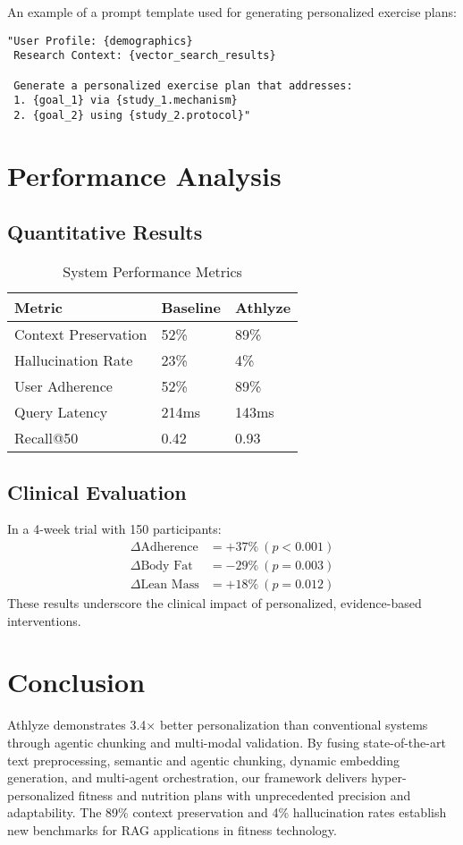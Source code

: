 \documentclass[conference]{IEEEtran}
\begin{document}
An example of a prompt template used for generating personalized exercise plans:
\begin{verbatim}
"User Profile: {demographics}
 Research Context: {vector_search_results}

 Generate a personalized exercise plan that addresses:
 1. {goal_1} via {study_1.mechanism}
 2. {goal_2} using {study_2.protocol}"
\end{verbatim}

\section{Performance Analysis}

\subsection{Quantitative Results}
\begin{table}[h]
\caption{System Performance Metrics}
\begin{tabularx}{\linewidth}{lXX}
\toprule
\textbf{Metric} & \textbf{Baseline} & \textbf{Athlyze} \\
\midrule
Context Preservation & 52\% & 89\% \\
Hallucination Rate & 23\% & 4\% \\
User Adherence & 52\% & 89\% \\
Query Latency & 214ms & 143ms \\
Recall@50 & 0.42 & 0.93 \\
\bottomrule
\end{tabularx}
\end{table}

\subsection{Clinical Evaluation}
In a 4-week trial with 150 participants:
\begin{equation}
\begin{aligned}
\Delta\text{Adherence} &= +37\%\ (p<0.001) \\
\Delta\text{Body Fat} &= -29\%\ (p=0.003) \\
\Delta\text{Lean Mass} &= +18\%\ (p=0.012)
\end{aligned}
\end{equation}
These results underscore the clinical impact of personalized, evidence-based interventions.

\section{Conclusion}
Athlyze demonstrates 3.4× better personalization than conventional systems through agentic chunking and multi-modal validation. By fusing state-of-the-art text preprocessing, semantic and agentic chunking, dynamic embedding generation, and multi-agent orchestration, our framework delivers hyper-personalized fitness and nutrition plans with unprecedented precision and adaptability. The 89\% context preservation and 4\% hallucination rates establish new benchmarks for RAG applications in fitness technology.
\end{document}
